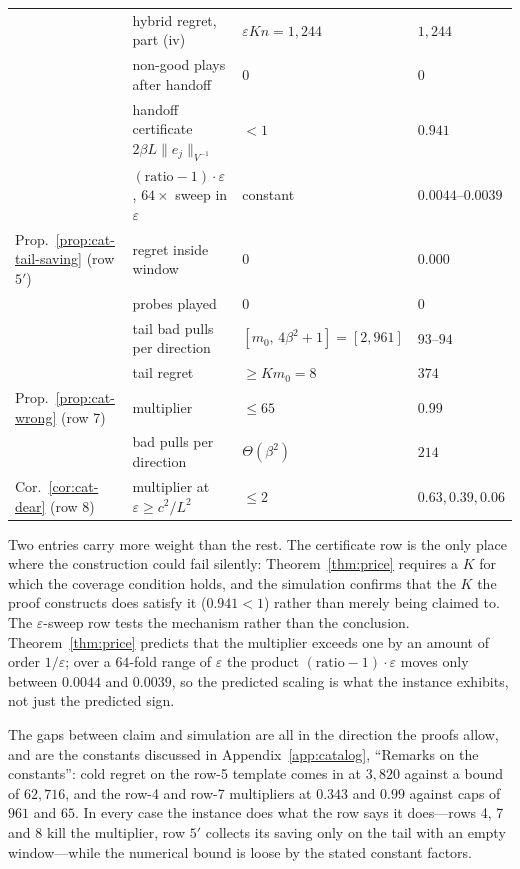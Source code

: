 \documentclass{article}
\theoremstyle{definition}
\theoremstyle{remark}
\newcommand{\eps}{\varepsilon}
\theoremstyle{remark}
\begin{document}
\begin{table}[h]
\begin{tabular}{@{}llll@{}}
 & hybrid regret, part (iv) & $\eps Kn=1{,}244$ & $1{,}244$ \\
 & non-good plays after handoff & $0$ & $0$ \\
 & handoff certificate $2\beta L\|e_j\|_{V^{-1}}$ & $<1$ & $0.941$ \\
 & $(\text{ratio}-1)\cdot\eps$, $64\times$ sweep in $\eps$ & constant & $0.0044$--$0.0039$ \\
\midrule
Prop.~\ref{prop:cat-tail-saving} (row $5'$) & regret inside window & $0$ & $0.000$ \\
 & probes played & $0$ & $0$ \\
 & tail bad pulls per direction & $[m_0,\,4\beta^2{+}1]=[2,961]$ & $93$--$94$ \\
 & tail regret & $\ge Km_0=8$ & $374$ \\
\midrule
Prop.~\ref{prop:cat-wrong} (row 7) & multiplier & $\le65$ & $0.99$ \\
 & bad pulls per direction & $\Theta(\beta^2)$ & $214$ \\
\midrule
Cor.~\ref{cor:cat-dear} (row 8) & multiplier at $\eps\ge c^2/L^2$ & $\le2$ & $0.63,0.39,0.06$ \\
\bottomrule
\end{tabular}
\end{table}

Two entries carry more weight than the rest. The certificate row is the only
place where the construction could fail silently: Theorem~\ref{thm:price}
requires a $K$ for which the coverage condition holds, and the simulation
confirms that the $K$ the proof constructs does satisfy it
($0.941<1$) rather than merely being claimed to. The $\eps$-sweep row tests the
mechanism rather than the conclusion. Theorem~\ref{thm:price} predicts that
the multiplier exceeds one by an amount of order $1/\eps$; over a $64$-fold
range of $\eps$ the product $(\text{ratio}-1)\cdot\eps$ moves only between
$0.0044$ and $0.0039$, so the predicted scaling is what the instance exhibits,
not just the predicted sign.

The gaps between claim and simulation are all in the direction the proofs
allow, and are the constants discussed in
Appendix~\ref{app:catalog}, ``Remarks on the constants'': cold regret on the
row-5 template comes in at $3{,}820$ against a bound of $62{,}716$, and the
row-4 and row-7 multipliers at $0.343$ and $0.99$ against caps of $961$ and
$65$. In every case the instance does what the row says it does---rows 4, 7
and 8 kill the multiplier, row $5'$ collects its saving only on the tail with
an empty window---while the numerical bound is loose by the stated constant
factors.
\end{document}
